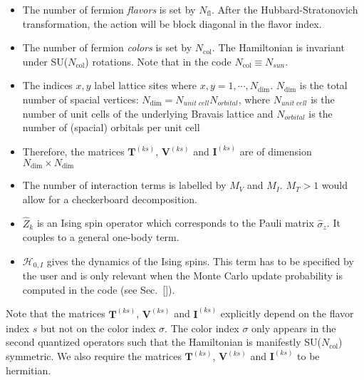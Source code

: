\begin{itemize}
\item The number of fermion \textit{flavors} is set by $N_{\mathrm{fl}}$.  After the Hubbard-Stratonovich transformation, the action will be block diagonal in the flavor index. 
\item The number of fermion \textit{colors} is set by $N_{\mathrm{col}}$.    The Hamiltonian is invariant under  SU($N_{\mathrm{col}}$)  rotations. Note that  in the code $ N_{\mathrm{col}} \equiv N_{sun} $. 
\item The indices $x,y$ label lattice sites where $x,y=1,\cdots, N_{\mathrm{dim}}$. 
$N_{\mathrm{dim}}$ is the total number of spacial vertices: $N_{\mathrm{dim}}=N_{unit\;cell} N_{orbital}$, where $N_{unit\;cell}$ is the number of unit cells of the underlying Bravais lattice and $N_{orbital}$ is the number of (spacial) orbitals per unit cell  
\item Therefore, the  matrices $\bm{T}^{(k s)}$, $\bm{V}^{(ks)}$  and $\bm{I}^{(ks)}$ are  of dimension $N_{\mathrm{dim}}\times N_{\mathrm{dim}}$
\item The number of interaction terms  is labelled by $M_V$   and $M_I$.   $M_T> 1 $ would allow for a checkerboard decomposition. 
\item $\hat{Z}_k$ is an Ising spin operator which corresponds to the Pauli matrix $\hat{\sigma}_{z}$. It couples to a general one-body term. 
\item  $\mathcal{H}_{0,I}$  gives the dynamics of the Ising spins. 
This term has to be specified by the user and is only relevant when the Monte Carlo update probability is computed in the code (see Sec.~\ref{}).
\end{itemize}
Note that the matrices  $\bm{T}^{(ks)}$,  $\bm{V}^{(ks)}$ and  $\bm{I}^{(ks)}$ explicitly depend on the flavor index $s$ but not on the color index $\sigma$. 
The color index $\sigma$ only appears in  the  second quantized operators such that the Hamiltonian is manifestly SU($N_{\mathrm{col}}$)    symmetric.  We also require
the matrices $\bm{T}^{(ks)}$,  $\bm{V}^{(ks)}$ and  $\bm{I}^{(ks)}$  to be  hermitian. 


